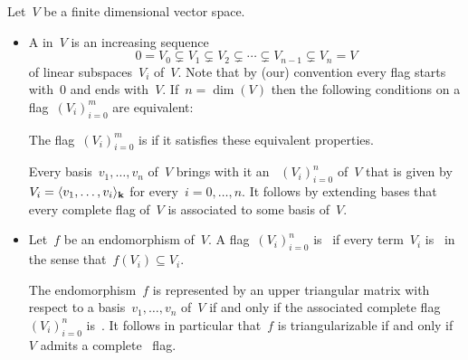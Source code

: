 \begin{recall}
  \label{triangular recall}
  Let~$V$ be a finite dimensional vector space.
  \begin{itemize}
    \item
      A  in~$V$ is an increasing sequence
      \[
        0
        =
        V_0
        \subsetneq
        V_1
        \subsetneq
        V_2
        \subsetneq
        \dotsb
        \subsetneq
        V_{n-1}
        \subsetneq
        V_n
        =
        V
      \]
      of linear subspaces~$V_i$ of~$V$.
      Note that by (our) convention every flag starts with~$0$ and ends with~$V$.
      If~$n = \dim(V)$ then the following conditions on a flag~$(V_i)_{i=0}^m$ are equivalent:
      The flag~$(V_i)_{i=0}^m$ is  if it satisfies these equivalent properties.
      
      Every basis~$v_1, \dotsc, v_n$ of~$V$ brings with it an ~$(V_i)_{i=0}^n$ of~$V$ that is given by~$V_i = \langle v_1, \dotsc, v_i\rangle_{\mathbf{k}}$ for every~$i = 0, \dotsc, n$.
      It follows by extending bases that every complete flag of~$V$ is associated to some basis of~$V$.
      
    \item
      Let~$f$ be an endomorphism of~$V$.
      A flag~$(V_i)_{i=0}^n$ is~ if every term~$V_i$ is~{} in the sense that~$f(V_i) \subseteq V_i$.
      
      The endomorphism~$f$ is represented by an upper triangular matrix with respect to a basis~$v_1, \dotsc, v_n$ of~$V$ if and only if the associated complete flag~$(V_i)_{i=0}^n$ is~{}.
      It follows in particular that~$f$ is triangularizable if and only if~$V$ admits a complete~{} flag.
      

\end{itemize}
\end{recall}
